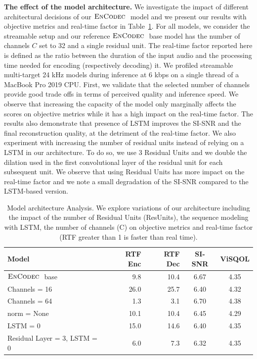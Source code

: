 {\noindent \bf The effect of the model architecture.} 
We investigate the impact of different architectural decisions of our $\textsc{EnCodec}~$ model and we present our results with objective metrics and real-time factor in Table~\ref{tab:arch}. For all models, we consider the streamable setup and our reference $\textsc{EnCodec}~$ base model has the number of channels $C$ set to 32 and a single residual unit. The real-time factor reported here is defined as the ratio between the duration of the input audio and the processing time needed for encoding (respectively decoding) it. We profiled streamable multi-target 24 kHz models during inference at 6 kbps on a single thread of a MacBook Pro 2019 CPU. 
First, we validate that the selected number of channels provide good trade offs in terms of perceived quality and inference speed. We observe that increasing the capacity of the model only marginally affects the scores on objective metrics while it has a high impact on the real-time factor. 
The results also demonstrate that presence of LSTM improves the SI-SNR and the final reconstruction quality, at the detriment of the real-time factor. We also experiment with increasing the number of residual units instead of relying on a LSTM in our architecture. To do so, we use 3 Residual Units and we double the dilation used in the first convolutional layer of the residual unit for each subsequent unit. We observe that using Residual Units has more impact on the real-time factor and we note a small degradation of the SI-SNR compared to the LSTM-based version. 


\begin{table}[t!]
  \caption{Model architecture Analysis. We explore variations of our architecture including the impact of the number of Residual Units (ResUnits), the sequence modeling with LSTM, the number of channels (C) on objective metrics and real-time factor (RTF greater than 1 is faster than real time).
  \label{tab:arch}}
  \centering
  \begin{tabular}{lrrcc}
    \toprule
    Model           & RTF Enc & RTF Dec & SI-SNR & ViSQOL \\
    \midrule
    $\textsc{EnCodec}~$ base              & 9.8 & 10.4 & 6.67 & 4.35\\
    \midrule
    Channels = 16                & 26.0 & 25.7 & 6.40 & 4.32\\
    Channels = 64                &  1.3 &  3.1 & 6.70 & 4.38\\
    norm = None                  & 10.1 & 10.4 & 6.45 & 4.29\\
    LSTM = 0                     & 15.0 & 14.6 & 6.40 & 4.35\\
    Residual Layer = 3, LSTM = 0 & 6.0 & 7.3 & 6.32 & 4.35\\
    \bottomrule
  \end{tabular}
\end{table}


